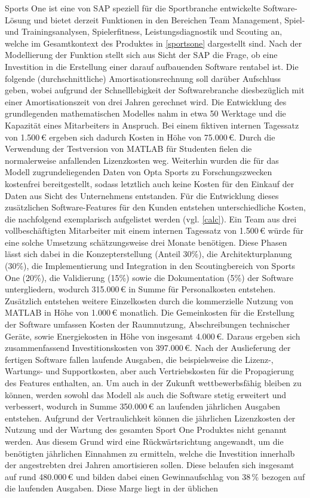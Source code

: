 Sports One ist eine von SAP speziell für die Sportbranche entwickelte Software-Lösung und bietet derzeit Funktionen in den Bereichen Team Management, Spiel- und Trainingsanalysen, Spielerfitness, Leistungsdiagnostik und Scouting an, welche im Gesamtkontext des Produktes in \vref{sportsone} dargestellt sind. Nach der Modellierung der Funktion stellt sich aus Sicht der SAP die Frage, ob eine Investition in die Erstellung einer darauf aufbauenden Software rentabel ist. Die folgende (durchschnittliche) Amortisationsrechnung soll darüber Aufschluss geben, wobei aufgrund der Schnelllebigkeit der Softwarebranche diesbezüglich mit einer Amortisationszeit von drei Jahren gerechnet wird. Die Entwicklung des grundlegenden mathematischen Modelles nahm in etwa 50 Werktage und die Kapazität eines Mitarbeiters in Anspruch. Bei einem fiktiven internen Tagessatz von \textsf{1.500\,\euro} ergeben sich dadurch Kosten in Höhe von \textsf{75.000\,\euro}. Durch die Verwendung der Testversion von MATLAB für Studenten fielen die normalerweise anfallenden Lizenzkosten weg. Weiterhin wurden die für das Modell zugrundeliegenden Daten von Opta Sports zu Forschungszwecken kostenfrei bereitgestellt, sodass letztlich auch keine Kosten für den Einkauf der Daten aus Sicht des Unternehmens entstanden. Für die Entwicklung dieses zusätzlichen Software-Features für den Kunden entstehen unterschiedliche Kosten, die nachfolgend exemplarisch aufgelistet werden (vgl. \vref{calc}). Ein Team aus drei vollbeschäftigten Mitarbeiter mit einem internen Tagessatz von \textsf{1.500\,\euro} würde für eine solche Umsetzung schätzungsweise drei Monate benötigen. Diese Phasen lässt sich dabei in die Konzepterstellung (Anteil 30\%), die Architekturplanung (30\%), die Implementierung und Integration in den Scoutingbereich von Sports One (20\%), die Validierung (15\%) sowie die Dokumentation (5\%) der Software untergliedern, wodurch \textsf{315.000\,\euro} in Summe für Personalkosten entstehen. Zusätzlich entstehen weitere Einzelkosten durch die kommerzielle Nutzung von MATLAB in Höhe von \textsf{1.000\,\euro} monatlich. Die Gemeinkosten für die Erstellung der Software umfassen Kosten der Raumnutzung, Abschreibungen technischer Geräte, sowie Energiekosten in Höhe von insgesamt \textsf{4.000\,\euro}. Daraus ergeben sich zusammenfassend Investitionskosten von \textsf{397.000\,\euro}. Nach der Auslieferung der fertigen Software fallen laufende Ausgaben, die beispielsweise die Lizenz-, Wartungs- und Supportkosten, aber auch Vertriebskosten für die Propagierung des Features enthalten, an. Um auch in der Zukunft wettbewerbsfähig bleiben zu können, werden sowohl das Modell als auch die Software stetig erweitert und verbessert, wodurch in Summe \textsf{350.000\,\euro} an laufenden jährlichen Ausgaben entstehen. Aufgrund der Vertraulichkeit können die jährlichen Lizenzkosten der Nutzung und der Wartung des gesamten Sport One Produktes nicht genannt werden. Aus diesem Grund wird eine Rückwärtsrichtung angewandt, um die benötigten jährlichen Einnahmen zu ermitteln, welche die Investition innerhalb der angestrebten drei Jahren amortisieren sollen. Diese belaufen sich insgesamt auf rund \textsf{480.000\,\euro} und bilden dabei einen Gewinnaufschlag von \textsf{38\,\%} bezogen auf die laufenden Ausgaben. Diese Marge liegt in der üblichen 